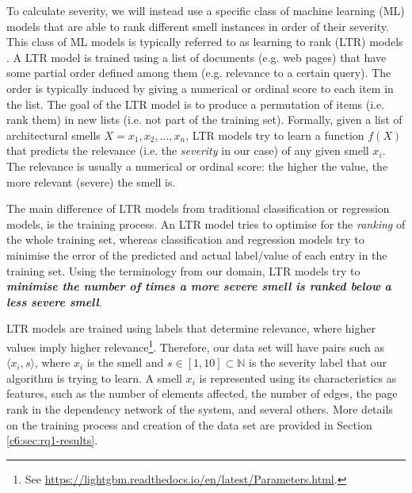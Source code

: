 To calculate severity, we will instead use a specific class of machine learning (ML) models that are able to rank different smell instances in order of their severity.
This class of ML models is typically referred to as learning to rank (LTR) models \cite{TieYan2009}.
A LTR model is trained using a list of documents (e.g. web pages) that have some partial order defined among them (e.g. relevance to a certain query).
The order is typically induced by giving a numerical or ordinal score to each item in the list.
The goal of the LTR model is to produce a permutation of items (i.e. rank them) in new lists (i.e. not part of the training set).
Formally, given a list of architectural smells $X = x_1,x_2,...,x_n$, LTR models try to learn a function $f(X)$ that predicts the relevance (i.e. the \emph{severity} in our case) of any given smell $x_i$.
The relevance is usually a numerical or ordinal score: the higher the value, the more relevant (severe) the smell is.

The main difference of LTR models from traditional classification or regression models, is the training process. An LTR model tries to optimise for the \emph{ranking} of the whole training set, whereas classification and regression models try to minimise the error of the predicted and actual label/value of each entry in the training set. 
Using the terminology from our domain, LTR models try to \textit{\textbf{minimise the number of times a more severe smell is ranked below a less severe smell}}.

LTR models are trained using labels that determine relevance, where higher values imply higher relevance\footnote{See \url{https://lightgbm.readthedocs.io/en/latest/Parameters.html}.}. 
Therefore, our data set will have pairs such as $\langle x_i, s \rangle$, where $x_i$ is the smell and $s\in [1, 10] \subset \mathbb{N}$ is the severity label that our algorithm is trying to learn.
A smell $x_i$ is represented using its characteristics as features, such as the number of elements affected, the number of edges, the page rank in the dependency network of the system, and several others. More details on the training process and creation of the data set are provided in Section \ref{c6:sec:rq1-results}.

